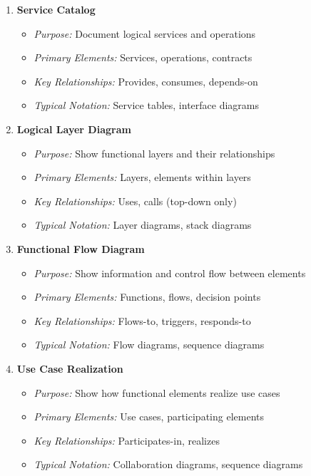 \documentclass[11pt,letterpaper]{article}
\begin{document}
\begin{enumerate}[label=\textbf{MT\arabic*:}, leftmargin=2.5em]
    \item \textbf{Service Catalog}
    \begin{itemize}[nosep]
        \item \textit{Purpose:} Document logical services and operations
        \item \textit{Primary Elements:} Services, operations, contracts
        \item \textit{Key Relationships:} Provides, consumes, depends-on
        \item \textit{Typical Notation:} Service tables, interface diagrams
    \end{itemize}
    
    \item \textbf{Logical Layer Diagram}
    \begin{itemize}[nosep]
        \item \textit{Purpose:} Show functional layers and their relationships
        \item \textit{Primary Elements:} Layers, elements within layers
        \item \textit{Key Relationships:} Uses, calls (top-down only)
        \item \textit{Typical Notation:} Layer diagrams, stack diagrams
    \end{itemize}
    
    \item \textbf{Functional Flow Diagram}
    \begin{itemize}[nosep]
        \item \textit{Purpose:} Show information and control flow between elements
        \item \textit{Primary Elements:} Functions, flows, decision points
        \item \textit{Key Relationships:} Flows-to, triggers, responds-to
        \item \textit{Typical Notation:} Flow diagrams, sequence diagrams
    \end{itemize}
    
    \item \textbf{Use Case Realization}
    \begin{itemize}[nosep]
        \item \textit{Purpose:} Show how functional elements realize use cases
        \item \textit{Primary Elements:} Use cases, participating elements
        \item \textit{Key Relationships:} Participates-in, realizes
        \item \textit{Typical Notation:} Collaboration diagrams, sequence diagrams
    \end{itemize}
    

\end{enumerate}
\end{document}
